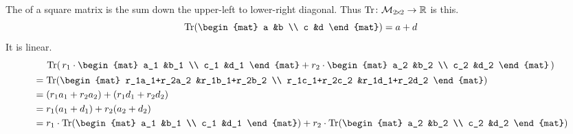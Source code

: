 \begin{frame}
\ex
The  of a square matrix 
is the sum down the upper-left to lower-right diagonal.
Thus
$\mbox{$\operatorname{Tr}\colon \mathcal{M}_{2 \! \times \! 2}\to \mathbb{R}$}$
is this.
\begin{equation*}
  \trace(\begin{mat}
    a &b \\
    c &d
  \end{mat})
  =a+d
\end{equation*}
It is linear.
\begin{multline*}
  \trace(\,
  r_1\cdot\begin{mat}
    a_1 &b_1 \\
    c_1 &d_1
  \end{mat}
  +
  r_2\cdot\begin{mat}
    a_2 &b_2 \\
    c_2 &d_2
  \end{mat}
  \,)                                              \\
  \begin{aligned}
    &=\trace(
      \begin{mat}
        r_1a_1+r_2a_2 &r_1b_1+r_2b_2 \\
        r_1c_1+r_2c_2 &r_1d_1+r_2d_2
      \end{mat}
      )                                       \\
    &=(r_1a_1+r_2a_2)+(r_1d_1+r_2d_2)         \\
    &=r_1(a_1+d_1)+r_2(a_2+d_2)               \\
    &=r_1\cdot\trace(
      \begin{mat}
        a_1 &b_1 \\
        c_1 &d_1
      \end{mat}
      )
      +
      r_2\cdot\trace(
      \begin{mat}
        a_2 &b_2 \\
        c_2 &d_2
      \end{mat}
      )
  \end{aligned} 
\end{multline*}
\end{frame}



